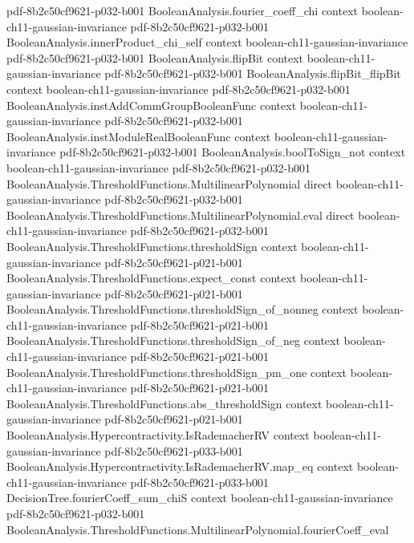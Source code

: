 \begin{theorem}
  {pdf-8b2c50cf9621-p032-b001}
\proofstep
  {BooleanAnalysis.fourier_coeff_chi}
  {context}
  {boolean-ch11-gaussian-invariance}
  {pdf-8b2c50cf9621-p032-b001}
\proofstep
  {BooleanAnalysis.innerProduct_chi_self}
  {context}
  {boolean-ch11-gaussian-invariance}
  {pdf-8b2c50cf9621-p032-b001}
\proofstep
  {BooleanAnalysis.flipBit}
  {context}
  {boolean-ch11-gaussian-invariance}
  {pdf-8b2c50cf9621-p032-b001}
\proofstep
  {BooleanAnalysis.flipBit_flipBit}
  {context}
  {boolean-ch11-gaussian-invariance}
  {pdf-8b2c50cf9621-p032-b001}
\proofstep
  {BooleanAnalysis.instAddCommGroupBooleanFunc}
  {context}
  {boolean-ch11-gaussian-invariance}
  {pdf-8b2c50cf9621-p032-b001}
\proofstep
  {BooleanAnalysis.instModuleRealBooleanFunc}
  {context}
  {boolean-ch11-gaussian-invariance}
  {pdf-8b2c50cf9621-p032-b001}
\proofstep
  {BooleanAnalysis.boolToSign_not}
  {context}
  {boolean-ch11-gaussian-invariance}
  {pdf-8b2c50cf9621-p032-b001}
\proofstep
  {BooleanAnalysis.ThresholdFunctions.MultilinearPolynomial}
  {direct}
  {boolean-ch11-gaussian-invariance}
  {pdf-8b2c50cf9621-p032-b001}
\proofstep
  {BooleanAnalysis.ThresholdFunctions.MultilinearPolynomial.eval}
  {direct}
  {boolean-ch11-gaussian-invariance}
  {pdf-8b2c50cf9621-p032-b001}
\proofstep
  {BooleanAnalysis.ThresholdFunctions.thresholdSign}
  {context}
  {boolean-ch11-gaussian-invariance}
  {pdf-8b2c50cf9621-p021-b001}
\proofstep
  {BooleanAnalysis.ThresholdFunctions.expect_const}
  {context}
  {boolean-ch11-gaussian-invariance}
  {pdf-8b2c50cf9621-p021-b001}
\proofstep
  {BooleanAnalysis.ThresholdFunctions.thresholdSign_of_nonneg}
  {context}
  {boolean-ch11-gaussian-invariance}
  {pdf-8b2c50cf9621-p021-b001}
\proofstep
  {BooleanAnalysis.ThresholdFunctions.thresholdSign_of_neg}
  {context}
  {boolean-ch11-gaussian-invariance}
  {pdf-8b2c50cf9621-p021-b001}
\proofstep
  {BooleanAnalysis.ThresholdFunctions.thresholdSign_pm_one}
  {context}
  {boolean-ch11-gaussian-invariance}
  {pdf-8b2c50cf9621-p021-b001}
\proofstep
  {BooleanAnalysis.ThresholdFunctions.abs_thresholdSign}
  {context}
  {boolean-ch11-gaussian-invariance}
  {pdf-8b2c50cf9621-p021-b001}
\proofstep
  {BooleanAnalysis.Hypercontractivity.IsRademacherRV}
  {context}
  {boolean-ch11-gaussian-invariance}
  {pdf-8b2c50cf9621-p033-b001}
\proofstep
  {BooleanAnalysis.Hypercontractivity.IsRademacherRV.map_eq}
  {context}
  {boolean-ch11-gaussian-invariance}
  {pdf-8b2c50cf9621-p033-b001}
\proofstep
  {DecisionTree.fourierCoeff_sum_chiS}
  {context}
  {boolean-ch11-gaussian-invariance}
  {pdf-8b2c50cf9621-p032-b001}
\proofstep
  {BooleanAnalysis.ThresholdFunctions.MultilinearPolynomial.fourierCoeff_eval}

\end{theorem}
